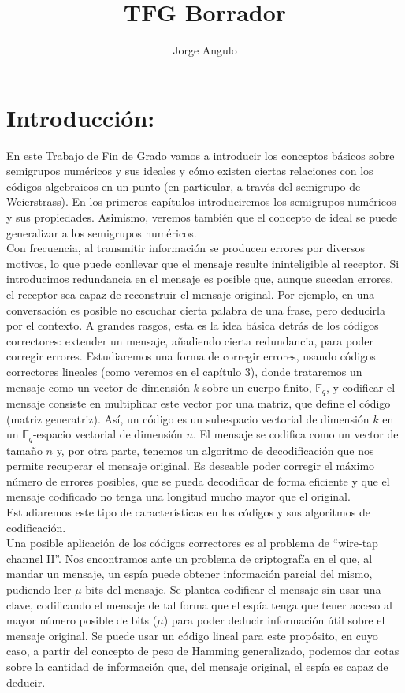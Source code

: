 \documentclass[11pt,spanish]{book}
\author{Jorge Angulo}
\title{TFG Borrador}
\begin{document}
\maketitle
\tableofcontents
\chapter*{Introducción:}
En este Trabajo de Fin de Grado vamos a introducir los conceptos básicos sobre semigrupos numéricos y sus ideales y cómo existen ciertas relaciones con los códigos algebraicos en un punto (en particular, a través del semigrupo de Weierstrass). En los primeros capítulos introduciremos los semigrupos numéricos y sus propiedades. Asimismo, veremos también que el concepto de ideal se puede generalizar a los semigrupos numéricos.\\

Con frecuencia, al transmitir información se producen errores por diversos motivos, lo que puede conllevar que el mensaje resulte ininteligible al receptor. Si introducimos redundancia en el mensaje es posible que, aunque sucedan errores, el receptor sea capaz de reconstruir el mensaje original. Por ejemplo, en una conversación es posible no escuchar cierta palabra de una frase, pero deducirla por el contexto. A grandes rasgos, esta es la idea básica detrás de los códigos correctores: extender un mensaje, añadiendo cierta redundancia, para poder corregir errores. Estudiaremos una forma de corregir errores, usando códigos correctores lineales (como veremos en el capítulo 3), donde trataremos un mensaje como un vector de dimensión $k$ sobre un cuerpo finito, $\mathbb{F}_q$, y codificar el mensaje consiste en multiplicar este vector por una matriz, que define el código (matriz generatriz). Así, un código es un subespacio vectorial de dimensión $k$ en un $\mathbb{F}_q$-espacio vectorial de dimensión $n$. El mensaje se codifica como un vector de tamaño $n$ y, por otra parte, tenemos un algoritmo de decodificación que nos permite recuperar el mensaje original.
Es deseable poder corregir el máximo número de errores posibles, que se pueda decodificar de forma eficiente y que el mensaje codificado no tenga una longitud mucho mayor que el original. Estudiaremos este tipo de características en los códigos y sus algoritmos de codificación.\\

Una posible aplicación de los códigos correctores es al problema de ``wire-tap channel II''. Nos encontramos ante un problema de criptografía en el que, al mandar un mensaje, un espía puede obtener información parcial del mismo, pudiendo leer $\mu$ bits del mensaje. Se plantea codificar el mensaje sin usar una clave, codificando el mensaje de tal forma que el espía tenga que tener acceso al mayor número posible de bits ($\mu$) para poder deducir información útil sobre el mensaje original. Se puede usar un código lineal para este propósito, en cuyo caso, a partir del concepto de peso de Hamming generalizado, podemos dar cotas sobre la cantidad de información que, del mensaje original, el espía es capaz de deducir.\\
\end{document}
